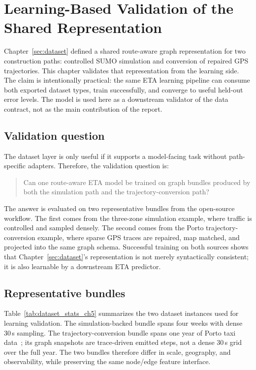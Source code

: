 \chapter{Learning-Based Validation of the Shared Representation}\label{sec:eval}

Chapter~\ref{sec:dataset} defined a shared route-aware graph representation for two construction paths: controlled SUMO simulation and conversion of repaired GPS trajectories. This chapter validates that representation from the learning side. The claim is intentionally practical: the same ETA learning pipeline can consume both exported dataset types, train successfully, and converge to useful held-out error levels. The model is used here as a downstream validator of the data contract, not as the main contribution of the report.

\section{Validation question}
The dataset layer is only useful if it supports a model-facing task without path-specific adapters. Therefore, the validation question is:
\begin{quote}
Can one route-aware ETA model be trained on graph bundles produced by both the simulation path and the trajectory-conversion path?
\end{quote}

The answer is evaluated on two representative bundles from the open-source workflow. The first comes from the three-zone simulation example, where traffic is controlled and sampled densely. The second comes from the Porto trajectory-conversion example, where sparse GPS traces are repaired, map matched, and projected into the same graph schema. Successful training on both sources shows that Chapter~\ref{sec:dataset}'s representation is not merely syntactically consistent; it is also learnable by a downstream ETA predictor.

\section{Representative bundles}
\begin{sloppypar}
Table~\ref{tab:dataset_stats_ch5} summarizes the two dataset instances used for learning validation. The simulation-backed bundle spans four weeks with dense 30\,s sampling. The trajectory-conversion bundle spans one year of Porto taxi data~\cite{porto2015pkdd}; its graph snapshots are trace-driven emitted steps, not a dense 30\,s grid over the full year. The two bundles therefore differ in scale, geography, and observability, while preserving the same node/edge feature interface.
\end{sloppypar}

